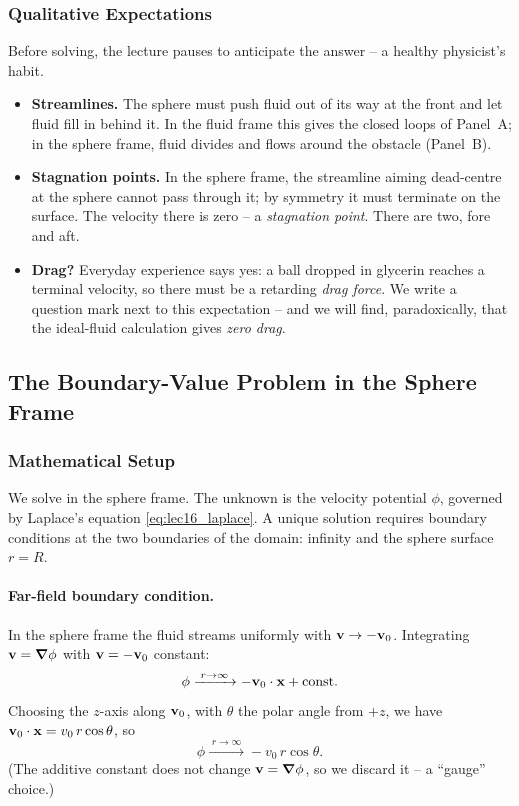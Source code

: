 \documentclass[../main.tex]{subfiles}
\begin{document}
\subsubsection*{Qualitative Expectations}
Before solving, the lecture pauses to anticipate the answer -- a healthy physicist's habit.

\begin{itemize}
  \item \textbf{Streamlines.} The sphere must push fluid out of its way at the front and let fluid fill in behind it. In the fluid frame this gives the closed loops of Panel~A; in the sphere frame, fluid divides and flows around the obstacle (Panel~B).
  \item \textbf{Stagnation points.} In the sphere frame, the streamline aiming dead-centre at the sphere cannot pass through it; by symmetry it must terminate on the surface. The velocity there is zero -- a \emph{stagnation point}. There are two, fore and aft.
  \item \textbf{Drag?} Everyday experience says yes: a ball dropped in glycerin reaches a terminal velocity, so there must be a retarding \emph{drag force}. We write a question mark next to this expectation -- and we will find, paradoxically, that the ideal-fluid calculation gives \emph{zero drag}.
\end{itemize}

\subsection{The Boundary-Value Problem in the Sphere Frame}\label{sec:lec16:bvp}

\subsubsection*{Mathematical Setup}
We solve in the sphere frame. The unknown is the velocity potential $\phi$, governed by Laplace's equation \eqref{eq:lec16_laplace}. A unique solution requires boundary conditions at the two boundaries of the domain: infinity and the sphere surface $r=R$.

\paragraph{Far-field boundary condition.}
In the sphere frame the fluid streams uniformly with $\mathbf{v}\to-\mathbf{v}_0$. Integrating $\mathbf{v}=\grad\phi$ with $\mathbf{v}=-\mathbf{v}_0$ constant:
\begin{equation}
  \phi \xrightarrow{\;r\to\infty\;} -\mathbf{v}_0\cdot\mathbf{x} + \text{const}.
  \label{eq:lec16_farfield}
\end{equation}
Choosing the $z$-axis along $\mathbf{v}_0$, with $\theta$ the polar angle from $+z$, we have $\mathbf{v}_0\cdot\mathbf{x}=v_0\, r\cos\theta$, so
\begin{equation}
  \phi \xrightarrow{\;r\to\infty\;} -v_0\, r\cos\theta.
  \label{eq:lec16_farfield_polar}
\end{equation}
(The additive constant does not change $\mathbf{v}=\grad\phi$, so we discard it -- a ``gauge'' choice.)
\end{document}
